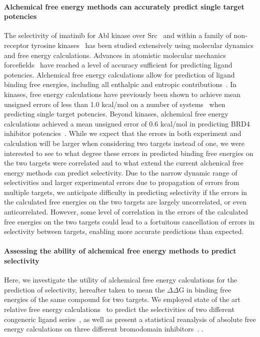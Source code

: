 \documentclass[9pt,lineno]{elife-modified} %
\begin{document}
\paragraph{Alchemical free energy methods can accurately predict single target potencies}
 The selectivity of imatinib for Abl kinase over Src~\citep{Lin2013-ft,Lin2014-iv} and within a family of non-receptor tyrosine kinases~\citep{Lin2013-mu} has been studied extensively using molecular dynamics and free energy calculations. Advances in atomistic molecular mechanics forcefields~\citep{Huang:J.Comput.Chem.:2013,Maier:J.Chem.TheoryComput.:2015,Harder:J.Chem.TheoryComput.:2016} have reached a level of accuracy  sufficient for predicting ligand potencies. Alchemical free energy calculations allow for prediction of ligand binding free energies, including all enthalpic and entropic contributions~\citep{Chodera2011-jn}. In kinases, free energy calculations have previously been shown to achieve mean unsigned errors of less than 1.0 kcal/mol on a number of systems~\citep{Wang:J.Am.Chem.Soc.:2015,Abel:Curr.Opin.Struct.Biol.:2017} when predicting single target potencies. Beyond kinases, alchemical free energy calculations achieved a mean unsigned error of 0.6 kcal/mol in predicting BRD4 inhibitor potencies~\citep{Aldeghi2015-lf}. While we expect that the errors in both experiment and calculation will be larger when considering two targets instead of one, we were interested to see to what degree these errors in predicted binding free energies on the two targets were correlated and to what extend the current alchenical free energy methods can predict selectivity. Due to the narrow dynamic range of selectivities and larger experimental errors due to propagation of errors from multiple targets, we anticipate difficulty in predicting selectivity if the errors in the calculated free energies on the two targets are largely uncorrelated, or even anticorrelated. However, some level of correlation in the errors of the calculated free energies on the two targets could lead to a fortuitous cancellation of errors in selectivity between targets, enabling more accurate predictions than expected. 

\paragraph{Assessing the ability of alchemical free energy methods to predict selectivity}
Here, we investigate the utility of alchemical free energy calculations for the prediction of selectivity, hereafter taken to mean the $\Delta \Delta$G in binding free energies of the same compound for two targets. We employed state of the art relative free energy calculations~\citep{Wang:J.Am.Chem.Soc.:2015} to predict the selectivities of two different congeneric ligand series~\citep{Shao2013-oe, Blake2016-su}, as well as present a statistical reanalysis of absolute free energy calculations on three different bromodomain inhibitors~\citep{Abel2017-gw}. . 
   
\end{document}
